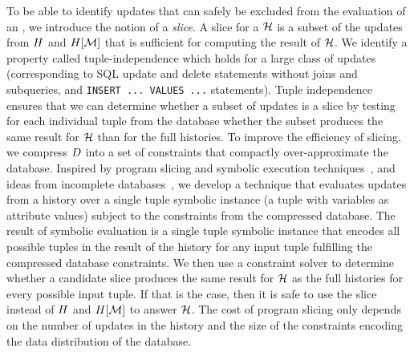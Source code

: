 % 
To be able to identify updates that can safely be excluded from the evaluation of an \abbrHW, we introduce the notion of a \emph{slice}. A slice for a \abbrHW $\mathcal{H}$ is a subset of the updates from $H$ and $H[\mathcal{M}]$ that is sufficient for computing the result of $\mathcal{H}$. We identify a property called tuple-independence which holds for a large class of updates (corresponding to SQL update and delete statements without joins and subqueries, and \lstinline!INSERT ... VALUES ...! statements). Tuple independence ensures that we can determine whether a subset of updates is a slice by testing for each individual tuple from the database whether the subset produces the same result for $\mathcal{H}$ than for the full histories. To improve the efficiency of slicing, we compress $D$ into a set of constraints that compactly over-approximate the database. Inspired by program slicing and symbolic execution techniques~\cite{bucur14,luckow14}, and ideas from incomplete databases~\cite{AG85,IL84a}, we develop a technique that evaluates updates from a history over a single tuple symbolic instance (a tuple with variables as attribute values) subject to the constraints from the compressed database. The result of symbolic evaluation is a single tuple symbolic instance that encodes all possible tuples in the result of the history for any input tuple fulfilling the compressed database constraints. We then use a constraint solver %
  to determine whether a candidate slice produces the same result for $\mathcal{H}$ as the full histories for every possible input tuple. If that is the case, then it is safe to use the slice instead of $H$ and $H[\mathcal{M}]$ to answer $\mathcal{H}$.
The cost of program slicing only depends on the number of updates in the history and the size of the constraints encoding the data distribution of the database. %
% 
% 
% 


% 
% 
% 
% 
% 
% 
% 
% 

